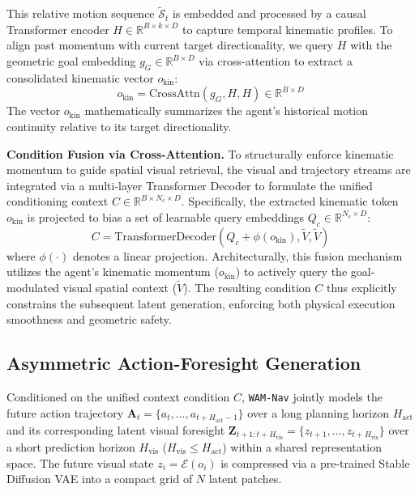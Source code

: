 \documentclass{article}
\begin{document}
This relative motion sequence $\tilde{\mathcal{S}}_t$ is embedded and processed by a causal Transformer encoder $H \in \mathbb{R}^{B \times k \times D}$ to capture temporal kinematic profiles. To align past momentum with current target directionality, we query $H$ with the geometric goal embedding $g_G \in \mathbb{R}^{B \times D}$ via cross-attention to extract a consolidated kinematic vector $o_{\mathrm{kin}}$:
\begin{equation}
    o_{\mathrm{kin}} = \mathrm{CrossAttn}(g_G, H, H) \in \mathbb{R}^{B \times D}
\end{equation}
The vector $o_{\mathrm{kin}}$ mathematically summarizes the agent's historical motion continuity relative to its target directionality.

\textbf{Condition Fusion via Cross-Attention.} 
To structurally enforce kinematic momentum to guide spatial visual retrieval, the visual and trajectory streams are integrated via a multi-layer Transformer Decoder to formulate the unified conditioning context $C \in \mathbb{R}^{B \times N_c \times D}$. Specifically, the extracted kinematic token $o_{\mathrm{kin}}$ is projected to bias a set of learnable query embeddings $Q_c \in \mathbb{R}^{N_c \times D}$:
\begin{equation}
    C = \mathrm{TransformerDecoder} \left( Q_c + \phi(o_{\mathrm{kin}}), \tilde{V}, \tilde{V} \right)
\end{equation}
where $\phi(\cdot)$ denotes a linear projection. Architecturally, this fusion mechanism utilizes the agent's kinematic momentum ($o_{\mathrm{kin}}$) to actively query the goal-modulated visual spatial context ($\tilde{V}$). The resulting condition $C$ thus explicitly constrains the subsequent latent generation, enforcing both physical execution smoothness and geometric safety.

\subsection{Asymmetric Action-Foresight Generation}

Conditioned on the unified context condition $C$, \texttt{WAM-Nav} jointly models the future action trajectory $\mathbf{A}_t = \{a_t, \dots, a_{t+H_{\mathrm{act}}-1}\}$ over a long planning horizon $H_{\mathrm{act}}$ and its corresponding latent visual foresight $\mathbf{Z}_{t+1:t+H_{\mathrm{vis}}} = \{z_{t+1}, \dots, z_{t+H_{\mathrm{vis}}}\}$ over a short prediction horizon $H_{\mathrm{vis}}$ ($H_{\mathrm{vis}} \le H_{\mathrm{act}}$) within a shared representation space. The future visual state $z_i = \mathcal{E}(o_i)$ is compressed via a pre-trained Stable Diffusion VAE \citep{stabilityai2022sd} into a compact grid of $N$ latent patches. 
\end{document}
